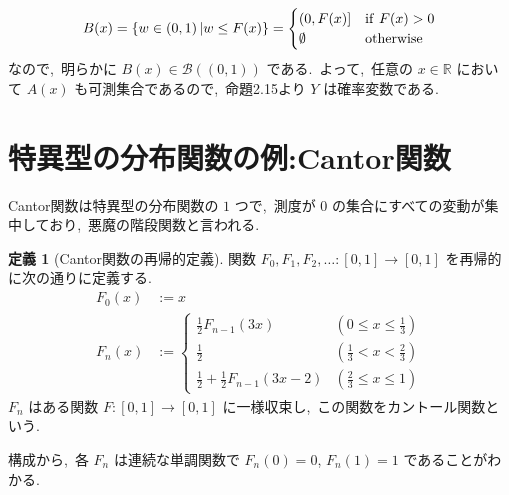 \documentclass[a4j,11pt]{jarticle}
\theoremstyle{definition}
\newtheorem{definition}[theorem]{定義}
\begin{document}
\begin{equation}
  B(x) = \left\{ w  \in\left( 0,1\right) | w \leq F(x)\right\} = 
  \begin{cases}
    \left( 0, F(x)\right] & {\rm if } \ F(x) > 0 \\
    \emptyset & {\rm otherwise}
  \end{cases}
\end{equation}
なので,\ 明らかに
$B(x) \in \mathcal{B}((0,1))$
である.\ 
よって,\ 任意の
$x\in \mathbb{R}$
において
$A(x)$
も可測集合であるので,\ 命題2.15より
$Y$
は確率変数である.\ 


\section*{特異型の分布関数の例:Cantor関数}
Cantor関数は特異型の分布関数の
$1$
つで,\ 測度が
$0$
の集合にすべての変動が集中しており,\ 悪魔の階段関数と言われる.\ 

\begin{definition}[Cantor関数の再帰的定義]
  関数
  $F_0,F_1,F_2,\ldots:[0,1]\to[0,1]$
  を再帰的に次の通りに定義する.\ 
  \begin{align}
    F_0(x)
    & := x\\
    F_n(x)
    & :=
    \begin{cases}
      \frac{1}{2}F_{n-1}(3x) & \left(0 \leq x \leq \frac{1}{3}\right) \\
      \frac{1}{2} & \left( \frac{1}{3} < x < \frac{2}{3}\right) \\
      \frac{1}{2} + \frac{1}{2}F_{n-1}(3x-2) & \left( \frac{2}{3} \leq x \leq 1\right)
    \end{cases}
  \end{align}
  $F_n$
  はある関数
  $F:[0,1]\to[0,1]$
  に一様収束し,\ この関数をカントール関数という.\ 
\end{definition}

構成から,\ 各
$F_n$
は連続な単調関数で
$F_n(0) = 0$,
$F_n(1) = 1$
であることがわかる.\ 
\end{document}
